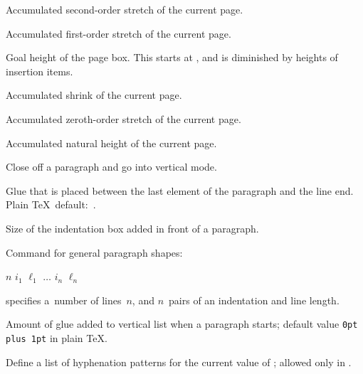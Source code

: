 \begin{glossinventory}
\item [\cs{pagefillstretch}]
      Accumulated second-order stretch of the current page.

\item [\cs{pagefilstretch}]
      Accumulated first-order stretch of the current page.

\item [\cs{pagegoal}]
      Goal height of the page box. This starts at ,
      and is diminished by heights of insertion items.

\item [\cs{pageshrink}]
      Accumulated shrink of the current page.

\item [\cs{pagestretch}]
      Accumulated zeroth-order stretch of the current page.

\item [\cs{pagetotal}]
      Accumulated natural height of the current page.

\item [\cs{par}]
      Close off a paragraph and go into vertical mode.

\item [\cs{parfillskip}]
      Glue that is placed between the last          
      element of the paragraph and the line end.
      Plain \TeX\ default:~.

\item [\cs{parindent}]
      Size of the indentation box added in front of a paragraph.

\item [\cs{parshape}]
      Command for general paragraph shapes: 
      \begin{disp}$n$ $i_1$ $\ell_1$ $\ldots$
                $i_n$ $\ell_n$\end{disp}
      specifies a~number
      of lines~$n$, and $n$~pairs of an indentation and
      line length.

\item [\cs{parskip}]
      Amount of glue added to vertical list when a paragraph starts; 
      default value \verb.0pt plus 1pt. in plain \TeX.

\item [\cs{patterns\gr{general text}}]
      Define a list of hyphenation patterns for the current
      value of ;  allowed only in \IniTeX.


\end{glossinventory}
